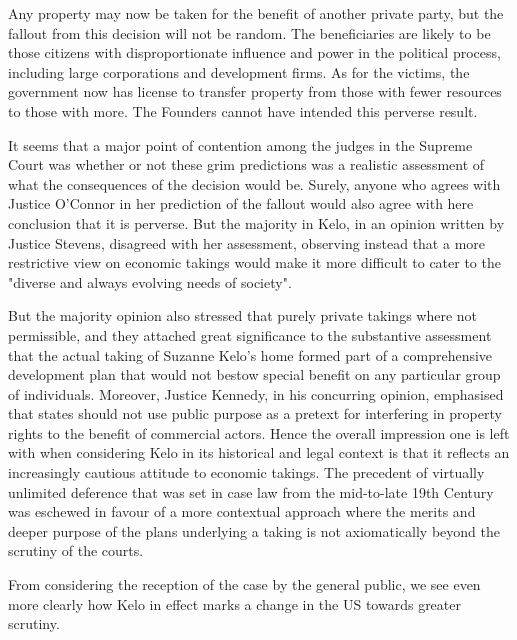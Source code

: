 {Any property may now be taken for the benefit of another private party, but the fallout from this decision will not be random. The beneficiaries are likely to be those citizens with disproportionate influence and power in the political process, including large corporations and development firms. As for the victims, the government now has license to transfer property from those with fewer resources to those with more. The Founders cannot have intended this perverse result.

It seems that a major point of contention among the judges in the Supreme Court was whether or not these grim predictions was a realistic assessment of what the consequences of the decision would be. Surely, anyone who agrees with Justice O'Connor in her prediction of the fallout would also agree with here conclusion that it is perverse. But the majority in Kelo, in an opinion written by Justice Stevens, disagreed with her assessment, observing instead that a more restrictive view on economic takings would make it more difficult to cater to the "diverse and always evolving needs of society". 

But the majority opinion also stressed that purely private takings where not permissible, and they attached great significance to the substantive assessment that the actual taking of Suzanne Kelo's home formed part of a comprehensive development plan that would not bestow special benefit on any particular group of individuals. Moreover, Justice Kennedy, in his concurring opinion, emphasised that states should not use public purpose as a pretext for interfering in property rights to the benefit of commercial actors.
Hence the overall impression one is left with when considering Kelo in its historical and legal context is that it reflects an increasingly cautious attitude to economic takings. The precedent of virtually unlimited deference that was set in case law from the mid-to-late 19th Century was eschewed in favour of a more contextual approach where the merits and deeper purpose of the plans underlying a taking is not axiomatically beyond the scrutiny of the courts.

From considering the reception of the case by the general public, we see even more clearly how Kelo in effect marks a change in the US towards greater scrutiny. 

}
